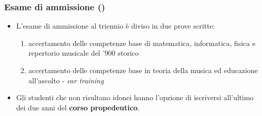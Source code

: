 %
%
%

\setcounter{ms}{0}
\begin{frame}
    \frametitle<+->{Esame di ammissione ()}

	\begin{itemize}

		\item L'esame di ammissione al triennio è diviso in due prove scritte:

      \begin{enumerate}

        \item accertamento delle competenze base di matematica, informatica,
	fisica e repertorio musicale del '900 storico


        \item accertamento delle competenze base in teoria della musica ed
        educazione all'ascolto - \emph{ear training}

     \end{enumerate}

    \item Gli studenti che non risultano idonei hanno l'opzione di iscriversi 
    all'ultimo dei due anni del \textbf{corso propedeutico}.

	\end{itemize}

\end{frame}
